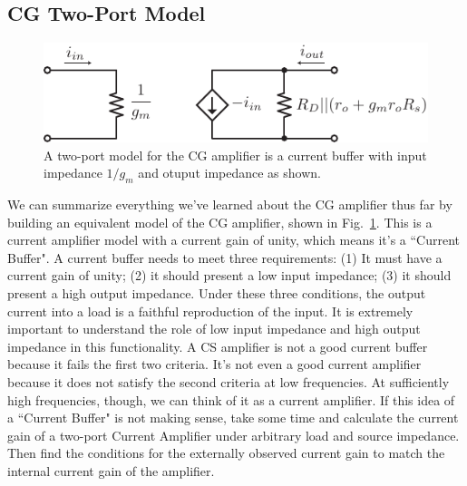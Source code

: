 \subsection{CG Two-Port Model}
\begin{figure}[tb]
\begin{center}
\includegraphics[scale=.9]{cg_model}
\end{center}
\caption{A two-port model for the CG amplifier is a current buffer with input impedance $1/g_m$ and otuput impedance as shown.  }
\label{fig:cg_model}
\end{figure}

We can summarize everything we've learned about the CG amplifier thus far by building an equivalent model of the CG amplifier, shown in Fig.~\ref{fig:cg_model}.  This is a current amplifier model with a current gain of unity, which means it's a ``Current Buffer".  A current buffer needs to meet three requirements:  (1) It must have a current gain of unity; (2) it should present a low input impedance;  (3) it should present a high output impedance.  Under these three conditions, the output current into a load is a faithful reproduction of the input.  It is extremely important to understand the role of low input impedance and high output impedance in this functionality.  A CS amplifier is not a good current buffer because it fails the first two criteria.  It's not even a good current amplifier because it does not satisfy the second criteria at low frequencies.  At sufficiently high frequencies, though, we can think of it as a current amplifier.   If this idea of a ``Current Buffer" is not making sense, take some time and calculate the current gain of a two-port Current Amplifier under arbitrary load and source impedance.  Then find the conditions for the externally observed current gain to match the internal current gain of the amplifier.
